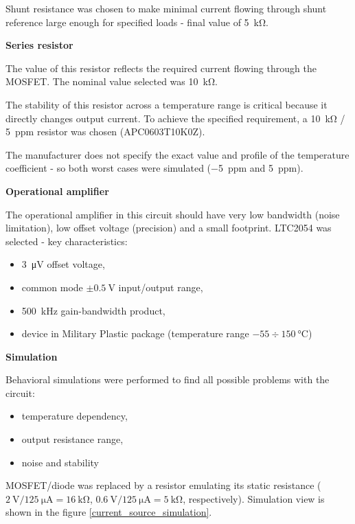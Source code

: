         Shunt resistance was chosen to make minimal current flowing through shunt reference large enough for specified loads - final value of \SI{5}{\kilo\ohm}.

        \bigskip \textbf{Series resistor}

        The value of this resistor reflects the required current flowing through the MOSFET. The nominal value selected was \SI{10}{\kilo\ohm}.

        The stability of this resistor across a temperature range is critical because it directly changes output current. To achieve the specified requirement, a \SI{10}{\kilo\ohm} / \SI{5}{ppm} resistor was chosen (APC0603T10K0Z).

        The manufacturer does not specify the exact value and profile of the temperature coefficient - so both worst cases were simulated (\SI{-5}{ppm} and \SI{5}{ppm}).

        \bigskip \textbf{Operational amplifier}

        The operational amplifier in this circuit should have very low bandwidth (noise limitation), low offset voltage (precision) and a small footprint. LTC2054 was selected - key characteristics:
        \begin{itemize}
            \item \SI{3}{\micro\volt} offset voltage,
            \item common mode $\pm \SI{0.5}{\volt}$ input/output range,
            \item \SI{500}{\kilo\hertz} gain-bandwidth product,
            \item device in Military Plastic package (temperature range $-55 \div \SI{150}{\degreeCelsius}$)
        \end{itemize}

        \bigskip \textbf{Simulation}
        
        Behavioral simulations were performed to find all possible problems with the circuit:
        \begin{itemize}
            \item temperature dependency,
            \item output resistance range,
            \item noise and stability
        \end{itemize}

        MOSFET/diode was replaced by a resistor emulating its static resistance ($\SI{2}{\volt}/\SI{125}{\micro\ampere} = \SI{16}{\kilo\ohm}$, $\SI{0.6}{\volt}/\SI{125}{\micro\ampere} = \SI{5}{\kilo\ohm}$, respectively). Simulation view is shown in the figure \ref{current_source_simulation}.

